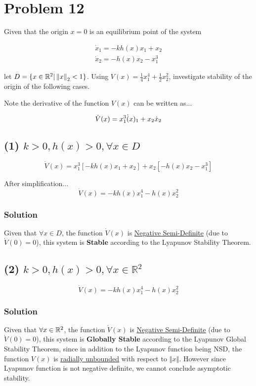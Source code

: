 \section*{Problem 12}

Given that the origin $x = 0$ is an equilibrium point of the system


$$
\begin{array}{l}
\dot{x}_{1}=-k h(x) x_{1}+x_{2} \\
\dot{x}_{2}=-h(x) x_{2}-x_{1}^{3}
\end{array}
$$

\noindent let $D = \{x \in \mathbb{R}^2 | \left\Vert x \right\Vert_2 < 1\}$. Using $V(x) = \frac{1}{4} x_1^4 + \frac{1}{2}x^2_2$, investigate stability of the origin of the following cases.

\noindent Note the derivative of the function $V(x)$ can be written as...

$$
\dot{V}(x) = x_1^3 \dot(x)_1 + x_2\dot{x}_2 \\
$$


\subsection*{(1) $k>0, h(x)>0, \forall x \in D$}


$$
\dot{V}(x) = x_1^3[-kh(x)x_1 + x_2] + x_2 [-h(x)x_2 -x_1^3]
$$

\noindent After simplification...
$$
\dot{V}(x) = -kh(x)x_1^4 - h(x)x_2^2
$$

\subsubsection*{Solution} Given that $\forall x \in D$, the function $\dot{V}(x)$ is \underline{Negative Semi-Definite} (due to $\dot{V}(0)=0$), this system is \textbf{Stable} according to the Lyapunov Stability Theorem.

\subsection*{(2) $k>0, h(x)>0, \forall x \in \mathbb{R}^{2}$}

$$
\dot{V}(x) = -kh(x)x_1^4 - h(x)x_2^2
$$


\subsubsection*{Solution} Given that $\forall x \in \mathbb{R}^2$, the function $\dot{V}(x)$ is \underline{Negative Semi-Definite} (due to $\dot{V}(0)=0$), this system is \textbf{Globally Stable} according to the Lyapunov Global Stability Theorem, since in addition to the Lyapunov function being NSD, the function $V(x)$ is \underline{radially unbounded} with respect to $\left\Vert x \right\Vert$. However since Lyapunov function is not negative definite, we cannot conclude asymptotic stability.


